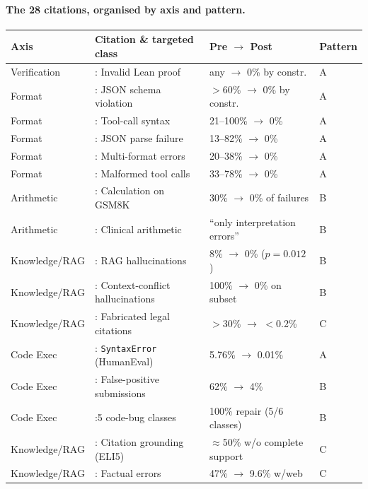 \documentclass{article}
\theoremstyle{taeplain}
\theoremstyle{taedefn}
\newcommand{\teArrow}{\ensuremath{\rightarrow}}
\newcommand{\teApprox}{\ensuremath{\approx}}
\begin{document}
\paragraph{The 28 citations, organised by axis and pattern.}
\begin{center}
\small
\begin{tabular}{p{2.2cm}p{4.5cm}p{3.5cm}p{1.5cm}}
\toprule
\textbf{Axis} & \textbf{Citation \& targeted class} & \textbf{Pre $\teArrow$ Post} & \textbf{Pattern}\\
\midrule
Verification & \citet{ren2025deepseekprover}: Invalid Lean proof & any $\teArrow$ 0\% by constr. & A\\
Format & \citet{openai2024structured}: JSON schema violation & $>$60\% $\teArrow$ 0\% by constr. & A\\
Format & \citet{zhang2023tooldec}: Tool-call syntax & 21--100\% $\teArrow$ 0\% & A\\
Format & \citet{suresh2025dingo}: JSON parse failure & 13--82\% $\teArrow$ 0\% & A\\
Format & \citet{dong2024xgrammar}: Multi-format errors & 20--38\% $\teArrow$ 0\% & A\\
Format & \citet{dong2026xgrammar2}: Malformed tool calls & 33--78\% $\teArrow$ 0\% & A\\
Arithmetic & \citet{chen2022pot}: Calculation on GSM8K & 30\% $\teArrow$ 0\% of failures & B\\
Arithmetic & \citet{goodell2025clinical}: Clinical arithmetic & ``only interpretation errors'' & B\\
Knowledge/RAG & \citet{wada2025radiology}: RAG hallucinations & 8\% $\teArrow$ 0\% ($p=0.012$) & B\\
Knowledge/RAG & \citet{wood2024acurai}: Context-conflict hallucinations & 100\% $\teArrow$ 0\% on subset & B\\
Knowledge/RAG & \citet{dantart2026fabrication}: Fabricated legal citations & $>$30\% $\teArrow$ $<$0.2\% & C\\
Code Exec & \citet{wen2024fixing}: \texttt{SyntaxError} (HumanEval) & 5.76\% $\teArrow$ 0.01\% & A\\
Code Exec & \citet{li2022alphacode}: False-positive submissions & 62\% $\teArrow$ 4\% & B\\
Code Exec & \citet{shi2024code}:5 code-bug classes & 100\% repair (5/6 classes) & B\\
Knowledge/RAG & \citet{gao2023citations}: Citation grounding (ELI5) & $\teApprox$50\% w/o complete support & C\\
Knowledge/RAG & \citet{openai2025gpt5}: Factual errors & 47\% $\teArrow$ 9.6\% w/web & C\\

\end{tabular}
\end{center}
\end{document}
